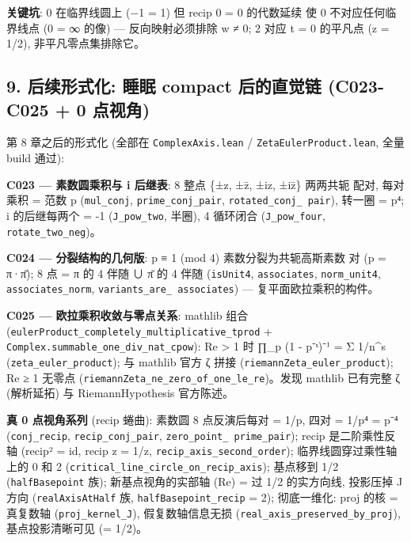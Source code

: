 \documentclass[
]{article}
\begin{document}
\textbf{关键坑}: 0 在临界线圆上 (−1\textbar{} = 1) 但 recip 0 =
0 的代数延续 使 0 不对应任何临界线点 (0 = ∞ 的像) --- 反向映射必须排除 w
≠ 0; 2 对应 t = 0 的平凡点 (z = 1/2), 非平凡零点集排除它。

\subsection{9. 后续形式化: 睡眠 compact 后的直觉链 (C023-C025 + 0
点视角)}\label{ux540eux7eedux5f62ux5f0fux5316-ux7761ux7720-compact-ux540eux7684ux76f4ux89c9ux94fe-c023-c025-0-ux70b9ux89c6ux89d2}

第 8 章之后的形式化 (全部在 \texttt{ComplexAxis.lean} /
\texttt{ZetaEulerProduct.lean}, 全量 build 通过):

\textbf{C023 --- 素数圆乘积与 i 后继表}: 8 整点 \{±z, ±z̄, ±iz, ±iz̄\}
两两共轭 配对, 每对乘积 = 范数 p (\texttt{mul\_conj},
\texttt{prime\_conj\_pair}, \texttt{rotated\_conj\_\ pair}), 转一圈 =
p⁴; i 的后继每两个 = -1 (\texttt{J\_pow\_two}, 半圈), 4 循环闭合
(\texttt{J\_pow\_four}, \texttt{rotate\_two\_neg})。

\textbf{C024 --- 分裂结构的几何版}: p ≡ 1 (mod 4) 素数分裂为共轭高斯素数
对 (p = π·π̄); 8 点 = π 的 4 伴随 ∪ π̄ 的 4 伴随 (\texttt{isUnit4},
\texttt{associates}, \texttt{norm\_unit4}, \texttt{associates\_norm},
\texttt{variants\_are\_\ associates}) --- 复平面欧拉乘积的构件。

\textbf{C025 --- 欧拉乘积收敛与零点关系}: mathlib 组合
(\texttt{eulerProduct\_completely\_multiplicative\_tprod} +
\texttt{Complex.summable\_one\_div\_nat\_cpow}): Re \textgreater{} 1 时
∏\_p (1 - p⁻ˢ)⁻¹ = Σ 1/n\^{}s (\texttt{zeta\_euler\_product}); 与
mathlib 官方 ζ 拼接 (\texttt{riemannZeta\_euler\_product}); Re ≥ 1
无零点 (\texttt{riemannZeta\_ne\_zero\_of\_one\_le\_re})。发现 mathlib
已有完整 ζ (解析延拓) 与 RiemannHypothesis 官方陈述。

\textbf{真 0 点视角系列} (recip 蜷曲): 素数圆 8 点反演后每对 = 1/p, 四对
= 1/p⁴ = p⁻⁴ (\texttt{conj\_recip}, \texttt{recip\_conj\_pair},
\texttt{zero\_point\_\ prime\_pair}); recip 是二阶乘性反轴 (recip² = id,
\textbar recip z\textbar{} = 1/\textbar z\textbar,
\texttt{recip\_axis\_second\_order}); 临界线圆穿过乘性轴上的 0 和 2
(\texttt{critical\_line\_circle\_on\_recip\_axis}); 基点移到 1/2
(\texttt{halfBasepoint} 族); 新基点视角的实部轴 (Re) = 过 1/2
的实方向线, 投影压掉 J 方向 (\texttt{realAxisAtHalf} 族,
\texttt{halfBasepoint\_recip} = 2); 彻底一维化: proj 的核 = 真复数轴
(\texttt{proj\_kernel\_J}), 假复数轴信息无损
(\texttt{real\_axis\_preserved\_by\_proj}), 基点投影清晰可见 (= 1/2)。
\end{document}
